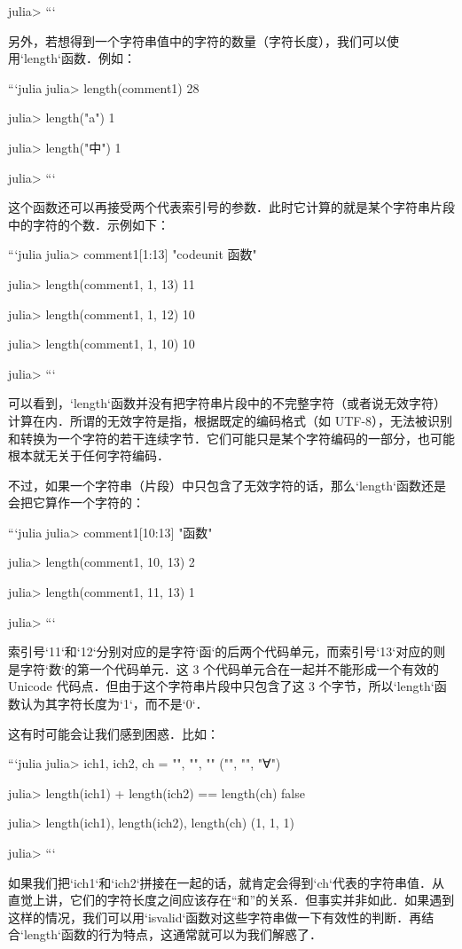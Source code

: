 julia> 
```

另外，若想得到一个字符串值中的字符的数量（字符长度），我们可以使用`length`函数．例如：

```julia
julia> length(comment1)
28

julia> length("a")
1

julia> length("中")
1

julia> 
```

这个函数还可以再接受两个代表索引号的参数．此时它计算的就是某个字符串片段中的字符的个数．示例如下：

```julia
julia> comment1[1:13]
"codeunit 函数"

julia> length(comment1, 1, 13)
11

julia> length(comment1, 1, 12)
10

julia> length(comment1, 1, 10)
10

julia> 
```

可以看到，`length`函数并没有把字符串片段中的不完整字符（或者说无效字符）计算在内．所谓的无效字符是指，根据既定的编码格式（如 UTF-8），无法被识别和转换为一个字符的若干连续字节．它们可能只是某个字符编码的一部分，也可能根本就无关于任何字符编码．

不过，如果一个字符串（片段）中只包含了无效字符的话，那么`length`函数还是会把它算作一个字符的：

```julia
julia> comment1[10:13]
"函数"

julia> length(comment1, 10, 13)
2

julia> length(comment1, 11, 13)
1

julia> 
```

索引号`11`和`12`分别对应的是字符`函`的后两个代码单元，而索引号`13`对应的则是字符`数`的第一个代码单元．这 3 个代码单元合在一起并不能形成一个有效的 Unicode 代码点．但由于这个字符串片段中只包含了这 3 个字节，所以`length`函数认为其字符长度为`1`，而不是`0`．

这有时可能会让我们感到困惑．比如：

```julia
julia> ich1, ich2, ch =  "", "", ""
("", "", "∀")

julia> length(ich1) + length(ich2) == length(ch)
false

julia> length(ich1), length(ich2), length(ch)
(1, 1, 1)

julia> 
```

如果我们把`ich1`和`ich2`拼接在一起的话，就肯定会得到`ch`代表的字符串值．从直觉上讲，它们的字符长度之间应该存在“和”的关系．但事实并非如此．如果遇到这样的情况，我们可以用`isvalid`函数对这些字符串做一下有效性的判断．再结合`length`函数的行为特点，这通常就可以为我们解惑了．

